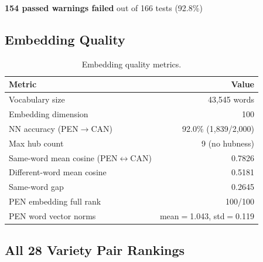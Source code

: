 \documentclass[11pt,a4paper]{article}
\begin{document}
\begin{center}
\Large\textbf{154 passed  warnings  failed} \quad out of 166 tests \quad (92.8\%)
\end{center}

\subsection{Embedding Quality}

\begin{table}[H]
\centering
\begin{tabular}{@{}lr@{}}
\toprule
\textbf{Metric} & \textbf{Value} \\
\midrule
Vocabulary size & 43{,}545 words \\
Embedding dimension & 100 \\
NN accuracy (PEN$\to$CAN) & 92.0\% (1{,}839/2{,}000) \\
Max hub count & 9 (no hubness) \\
Same-word mean cosine (PEN$\leftrightarrow$CAN) & 0.7826 \\
Different-word mean cosine & 0.5181 \\
Same-word gap & 0.2645 \\
PEN embedding full rank & 100/100 \\
PEN word vector norms & mean$=$1.043, std$=$0.119 \\
\bottomrule
\end{tabular}
\caption{Embedding quality metrics.}
\end{table}

\subsection{All 28 Variety Pair Rankings}
\end{document}
